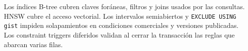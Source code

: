 Los índices B-tree cubren claves foráneas, filtros y joins usados por las
consultas. HNSW cubre el acceso vectorial. Los intervalos semiabiertos y
\texttt{EXCLUDE USING gist} impiden solapamientos en condiciones comerciales y
versiones publicadas. Los constraint triggers diferidos validan al cerrar la
transacción las reglas que abarcan varias filas.
